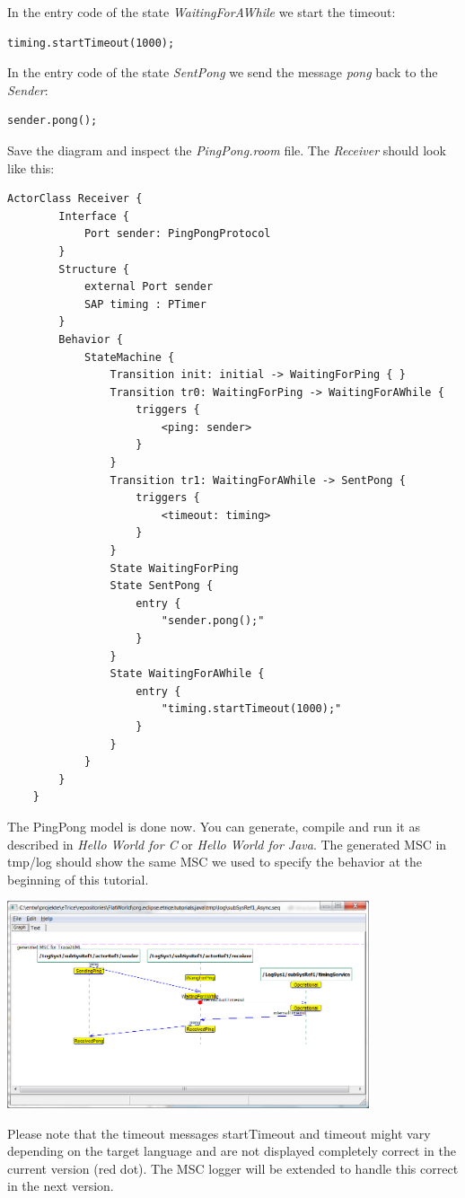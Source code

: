 In the entry code of the state \emph{WaitingForAWhile} we start the timeout: 

\begin{verbatim}
timing.startTimeout(1000);
\end{verbatim}

In the entry code of the state \emph{SentPong} we send the message \emph{pong} back to the \emph{Sender}: 

\begin{verbatim}
sender.pong();
\end{verbatim}

Save the diagram and inspect the \emph{PingPong.room} file. The \emph{Receiver} should look like this:

\begin{lstlisting}[language=ROOM]
	ActorClass Receiver {
		Interface {
			Port sender: PingPongProtocol
		}
		Structure {
			external Port sender
			SAP timing : PTimer
		}
		Behavior {
			StateMachine {
				Transition init: initial -> WaitingForPing { }
				Transition tr0: WaitingForPing -> WaitingForAWhile {
					triggers {
						<ping: sender>
					}
				}
				Transition tr1: WaitingForAWhile -> SentPong {
					triggers {
						<timeout: timing>
					}
				}
				State WaitingForPing
				State SentPong {
					entry {
						"sender.pong();"
					}
				}
				State WaitingForAWhile {
					entry {
						"timing.startTimeout(1000);"
					}
				}
			}
		}
	}
\end{lstlisting}

The PingPong model is done now. You can generate, compile and run it as described in \emph{Hello World for C} or \emph{Hello World for Java}. The generated MSC in tmp/log should show the same MSC we used to specify the behavior at the beginning of this tutorial.

\includegraphics[width=0.8\textwidth]{images/017-01-MSC.png}

Please note that the timeout messages startTimeout and timeout might vary depending on the target language and are not displayed completely correct in the current version (red dot). The MSC logger will be extended to handle this correct in the next version.


